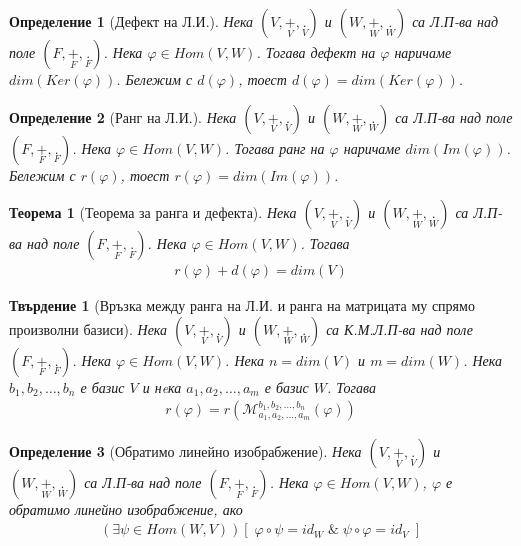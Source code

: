 \documentclass[12pt]{article}
\newtheorem{theorem}{Теорема}%
\newtheorem{proposition}{Твърдение}%
\newtheorem{definition}{Определение}%
\begin{document}
\begin{definition}[Дефект на Л.И.]
Нека \((V, \underset{V}{+}, \underset{V}{.})\) и \((W, \underset{W}{+}, \underset{W}{.})\) са Л.П-ва над поле \((F, \underset{F}{+}, \underset{F}{.})\).
Нека \(\varphi \in Hom(V, W)\).
Тогава дефект на \(\varphi\) наричаме \(dim(Ker(\varphi))\).
Бележим с \(d(\varphi)\), тоест \(d(\varphi) = dim(Ker(\varphi))\).
\end{definition}

\begin{definition}[Ранг на Л.И.]
Нека \((V, \underset{V}{+}, \underset{V}{.})\) и \((W, \underset{W}{+}, \underset{W}{.})\) са Л.П-ва над поле \((F, \underset{F}{+}, \underset{F}{.})\).
Нека \(\varphi \in Hom(V, W)\).
Тогава ранг на \(\varphi\) наричаме \(dim(Im(\varphi))\).
Бележим с \(r(\varphi)\), тоест \(r(\varphi) = dim(Im(\varphi))\).
\end{definition}

\begin{theorem}[Теорема за ранга и дефекта]
Нека \((V, \underset{V}{+}, \underset{V}{.})\) и \((W, \underset{W}{+}, \underset{W}{.})\) са Л.П-ва над поле \((F, \underset{F}{+}, \underset{F}{.})\).
Нека \(\varphi \in Hom(V, W)\).
Тогава
\begin{align*}
r(\varphi) + d(\varphi) = dim(V)
\end{align*}
\end{theorem}

\begin{proposition}[Връзка между ранга на Л.И. и ранга на матрицата му спрямо произволни базиси]
Нека \((V, \underset{V}{+}, \underset{V}{.})\) и \((W, \underset{W}{+}, \underset{W}{.})\) са К.М.Л.П-ва над поле \((F, \underset{F}{+}, \underset{F}{.})\).
Нека \(\varphi \in Hom(V, W)\).
Нека \(n = dim(V)\) и \(m = dim(W)\).
Нека \(b_1, b_2, \dots, b_n\) е базис \(V\)
и нeка \(a_1, a_2, \dots, a_m\) е базис \(W\).
Тогава
\begin{align*}
r(\varphi) = r\left(\mathcal{M}_{a_1, a_2, \dots, a_m}^{b_1, b_2, \dots, b_n}(\varphi)\right)
\end{align*}
\end{proposition}

\begin{definition}[Обратимо линейно изобрабжение]
Нека \((V, \underset{V}{+}, \underset{V}{.})\) и \((W, \underset{W}{+}, \underset{W}{.})\) са Л.П-ва над поле \((F, \underset{F}{+}, \underset{F}{.})\).
Нека \(\varphi \in Hom(V, W)\), \(\varphi\) е обратимо линейно изобрабжение,
ако
\begin{align*}
(\exists \psi \in Hom(W, V))[\; \varphi \circ \psi = id_W \; \& \; \psi \circ \varphi = id_V \;]
\end{align*}
\end{definition}
\end{document}
